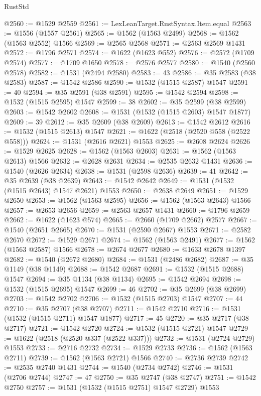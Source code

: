 \begin{lexlean}{RustStd}
\begin{coremodule}
@2560 := @1529 @2559
@2561 := LexLeanTarget.RustSyntax.Item.equal
@2563 := @1556 (@1557 @2561)
@2565 := @1562 (@1563 @2499)
@2568 := @1562 (@1563 @2552) @1566
@2569 := @2565 @2568
@2571 := @2563 @2569 @1431
@2572 := @1796 @2571
@2574 := @1622 (@1623 @552)
@2576 := @2572 (@1709 @2574)
@2577 := @1709 @1650
@2578 := @2576 @2577
@2580 := @1540 (@2560 @2578)
@2582 := @1531 (@2494 @2580)
@2583 := 43
@2586 := @35 @2583 (@38 @2583)
@2587 := @1542 @2586
@2590 := @1532 (@1515 @2587) @1547
@2591 := 40
@2594 := @35 @2591 (@38 @2591)
@2595 := @1542 @2594
@2598 := @1532 (@1515 @2595) @1547
@2599 := 38
@2602 := @35 @2599 (@38 @2599)
@2603 := @1542 @2602
@2608 := @1531 (@1532 (@1515 @2603) @1547 @1877)
@2609 := 39
@2612 := @35 @2609 (@38 @2609)
@2613 := @1542 @2612
@2616 := @1532 (@1515 @2613) @1547
@2621 := @1622 (@2518 (@2520 @558 (@2522 @558)))
@2624 := @1531 (@2616 @2621) @1553
@2625 := @2608 @2624
@2626 := @1529 @2625
@2628 := @1562 (@1563 @2603)
@2631 := @1562 (@1563 @2613) @1566
@2632 := @2628 @2631
@2634 := @2535 @2632 @1431
@2636 := @1540 (@2626 @2634)
@2638 := @1531 (@2598 @2636)
@2639 := 41
@2642 := @35 @2639 (@38 @2639)
@2643 := @1542 @2642
@2649 := @1531 (@1532 (@1515 @2643) @1547 @2621) @1553
@2650 := @2638 @2649
@2651 := @1529 @2650
@2653 := @1562 (@1563 @2595)
@2656 := @1562 (@1563 @2643) @1566
@2657 := @2653 @2656
@2659 := @2563 @2657 @1431
@2660 := @1796 @2659
@2662 := @1622 (@1623 @574)
@2665 := @2660 (@1709 @2662) @2577
@2667 := @1540 (@2651 @2665)
@2670 := @1531 (@2590 @2667) @1553
@2671 := @2582 @2670
@2672 := @1529 @2671
@2674 := @1562 (@1563 @2491)
@2677 := @1562 (@1563 @2587) @1566
@2678 := @2674 @2677
@2680 := @1633 @2678 @1397
@2682 := @1540 (@2672 @2680)
@2684 := @1531 (@2486 @2682)
@2687 := @35 @1149 (@38 @1149)
@2688 := @1542 @2687
@2691 := @1532 (@1515 @2688) @1547
@2694 := @35 @1134 (@38 @1134)
@2695 := @1542 @2694
@2698 := @1532 (@1515 @2695) @1547
@2699 := 46
@2702 := @35 @2699 (@38 @2699)
@2703 := @1542 @2702
@2706 := @1532 (@1515 @2703) @1547
@2707 := 44
@2710 := @35 @2707 (@38 @2707)
@2711 := @1542 @2710
@2716 := @1531 (@1532 (@1515 @2711) @1547 @1877)
@2717 := 45
@2720 := @35 @2717 (@38 @2717)
@2721 := @1542 @2720
@2724 := @1532 (@1515 @2721) @1547
@2729 := @1622 (@2518 (@2520 @337 (@2522 @337)))
@2732 := @1531 (@2724 @2729) @1553
@2733 := @2716 @2732
@2734 := @1529 @2733
@2736 := @1562 (@1563 @2711)
@2739 := @1562 (@1563 @2721) @1566
@2740 := @2736 @2739
@2742 := @2535 @2740 @1431
@2744 := @1540 (@2734 @2742)
@2746 := @1531 (@2706 @2744)
@2747 := 47
@2750 := @35 @2747 (@38 @2747)
@2751 := @1542 @2750
@2757 := @1531 (@1532 (@1515 @2751) @1547 @2729) @1553

\end{coremodule}
\end{lexlean}
